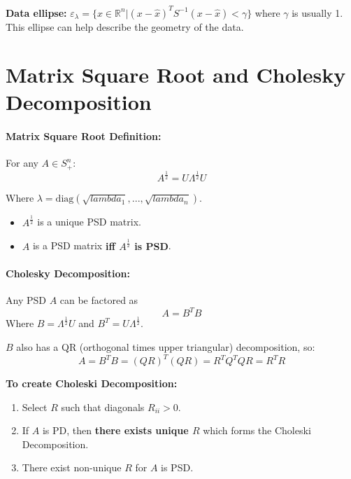 \documentclass[a4paper,12pt]{report}
\def\reals{\mathbb{R}}
\begin{document}
\textbf{Data ellipse: } $\varepsilon_\lambda = \{x\in \reals^n | (x-\hat{x})^T S^{-1} (x-\hat{x}) < \gamma\}$ where $\gamma$ is usually 1. This ellipse can help describe the geometry of the data.


\section{Matrix Square Root and Cholesky Decomposition}

\paragraph{Matrix Square Root Definition: } For any $A\in S_+^n$: 
\begin{equation}
	A^{\frac{1}{2}} = U\Lambda^{\frac{1}{2}} U
\end{equation}

Where $\lambda = \text{diag}(\sqrt{lambda_1}, ..., \sqrt{lambda_n})$.
\begin{itemize}
\item $A^\frac{1}{2}$ is a unique PSD matrix.
\item $A$ is a PSD matrix \textbf{iff $A^{\frac{1}{2}}$ is PSD}.
\end{itemize}

\paragraph{Cholesky Decomposition: } Any PSD $A$ can be factored as 
\begin{equation}
	A = B^T B
\end{equation}
Where $B = \Lambda^{\frac{1}{2}} U$ and $B^T = U\Lambda^{\frac{1}{2}}$.


$B$ also has a QR (orthogonal times upper triangular) decomposition, so: 
\begin{equation}
	A = B^T B = (QR)^T(QR) = R^TQ^TQR = R^TR
\end{equation}

\textbf{To create Choleski Decomposition: } 
\begin{enumerate}
\item Select $R$ such that diagonals $R_{ii} > 0$.
\item If $A$ is PD, then \textbf{there exists unique $R$} which forms the Choleski Decomposition.
\item There exist non-unique $R$ for $A$ is PSD.
\end{enumerate}
\end{document}
